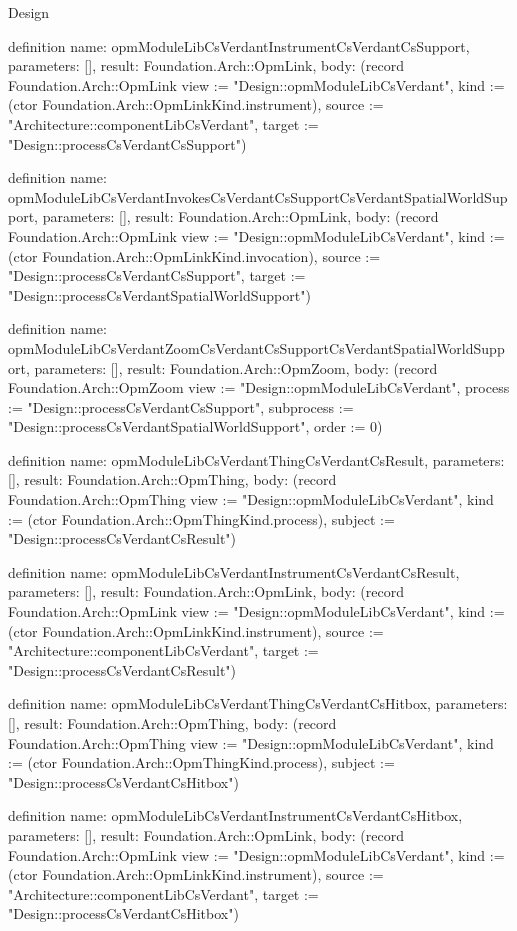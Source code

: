 \begin{lexlean}{Design}
\begin{semanticmodule}
definition{
  name: opmModuleLibCsVerdantInstrumentCsVerdantCsSupport,
  parameters: [],
  result: Foundation.Arch::OpmLink,
  body: (record Foundation.Arch::OpmLink {view := "Design::opmModuleLibCsVerdant", kind := (ctor Foundation.Arch::OpmLinkKind.instrument), source := "Architecture::componentLibCsVerdant", target := "Design::processCsVerdantCsSupport"})
}

definition{
  name: opmModuleLibCsVerdantInvokesCsVerdantCsSupportCsVerdantSpatialWorldSupport,
  parameters: [],
  result: Foundation.Arch::OpmLink,
  body: (record Foundation.Arch::OpmLink {view := "Design::opmModuleLibCsVerdant", kind := (ctor Foundation.Arch::OpmLinkKind.invocation), source := "Design::processCsVerdantCsSupport", target := "Design::processCsVerdantSpatialWorldSupport"})
}

definition{
  name: opmModuleLibCsVerdantZoomCsVerdantCsSupportCsVerdantSpatialWorldSupport,
  parameters: [],
  result: Foundation.Arch::OpmZoom,
  body: (record Foundation.Arch::OpmZoom {view := "Design::opmModuleLibCsVerdant", process := "Design::processCsVerdantCsSupport", subprocess := "Design::processCsVerdantSpatialWorldSupport", order := 0})
}

definition{
  name: opmModuleLibCsVerdantThingCsVerdantCsResult,
  parameters: [],
  result: Foundation.Arch::OpmThing,
  body: (record Foundation.Arch::OpmThing {view := "Design::opmModuleLibCsVerdant", kind := (ctor Foundation.Arch::OpmThingKind.process), subject := "Design::processCsVerdantCsResult"})
}

definition{
  name: opmModuleLibCsVerdantInstrumentCsVerdantCsResult,
  parameters: [],
  result: Foundation.Arch::OpmLink,
  body: (record Foundation.Arch::OpmLink {view := "Design::opmModuleLibCsVerdant", kind := (ctor Foundation.Arch::OpmLinkKind.instrument), source := "Architecture::componentLibCsVerdant", target := "Design::processCsVerdantCsResult"})
}

definition{
  name: opmModuleLibCsVerdantThingCsVerdantCsHitbox,
  parameters: [],
  result: Foundation.Arch::OpmThing,
  body: (record Foundation.Arch::OpmThing {view := "Design::opmModuleLibCsVerdant", kind := (ctor Foundation.Arch::OpmThingKind.process), subject := "Design::processCsVerdantCsHitbox"})
}

definition{
  name: opmModuleLibCsVerdantInstrumentCsVerdantCsHitbox,
  parameters: [],
  result: Foundation.Arch::OpmLink,
  body: (record Foundation.Arch::OpmLink {view := "Design::opmModuleLibCsVerdant", kind := (ctor Foundation.Arch::OpmLinkKind.instrument), source := "Architecture::componentLibCsVerdant", target := "Design::processCsVerdantCsHitbox"})
}


\end{semanticmodule}
\end{lexlean}
